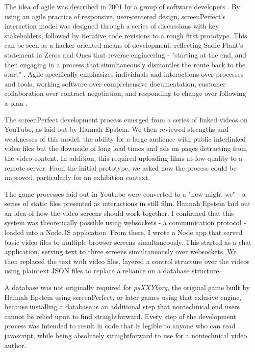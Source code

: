 The idea of agile was described in 2001 by a group of software developers \parencite{agile}. By using an agile practice of responsive, user-centered design, screenPerfect's interaction model was designed through a series of discussions with key stakeholders, followed by iterative code revisions to a rough first prototype. This can be seen as a hacker-oriented means of development, reflecting Sadie Plant's statement in Zeros and Ones that reverse engineering - "starting at the end, and then engaging in a process that simultaneously dismantles the route back to the start" \parencite{plant}. Agile specifically emphasizes individuals and interactions over processes and tools, working software over comprehensive documentation, customer collaboration over contract negotiation, and responding to change over following a plan \parencite{agile}. 

The screenPerfect development process emerged from a series of linked videos on YouTube, as laid out by Hannah Epstein. We then reviewed strengths and weaknesses of this model: the ability for a large audience with public interlinked video files but the downside of long load times and ads on pages detracting from the video content. In addition, this required uploading films at low quality to a remote server. From the initial prototype, we asked how the process could be improved, particularly for an exhibition context. 

The game processes laid out in Youtube were converted to a "how might we" - a series of static files presented as interactions in still film. Hannah Epstein laid out an idea of how the video screens should work together. I confirmed that this system was theoretically possible using websockets - a communication protocol - loaded into a Node.JS application. From there, I wrote a Node app that served basic video files to multiple browser screens simultaneously. This started as a chat application, serving text to three screens simultaneously over websockets. We then replaced the text with video files, layered a control structure over the videos using plaintext JSON files to replace a reliance on a database structure.

A database was not originally required for \textit{psXXYborg}, the original game built by Hannah Epstein using screenPerfect, or later games using that exlusive engine, because installing a database is an additional step that nontechnical end users cannot be relied upon to find straightforward. Every step of the development process was intended to result in code that is legible to anyone who can read javascript, while being absolutely straightforward to use for a nontechnical video author. 

